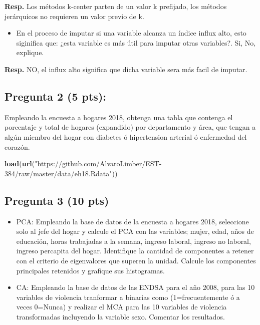 \documentclass[
]{article}
\newenvironment{Shaded}{\begin{snugshade}}{\end{snugshade}}
\newcommand{\KeywordTok}[1]{\textcolor[rgb]{0.13,0.29,0.53}{\textbf{#1}}}
\newcommand{\NormalTok}[1]{#1}
\newcommand{\StringTok}[1]{\textcolor[rgb]{0.31,0.60,0.02}{#1}}
\providecommand{\tightlist}{%
  \setlength{\itemsep}{0pt}\setlength{\parskip}{0pt}}
\begin{document}
\textbf{Resp.} Los métodos k-center parten de un valor k prefijado, los
métodos jerárquicos no requieren un valor previo de k.

\begin{itemize}
\tightlist
\item
  En el proceso de imputar si una variable alcanza un índice influx
  alto, esto siginifica que: ¿esta variable es más útil para imputar
  otras variables?. Si, No, explique.
\end{itemize}

\textbf{Resp.} NO, el influx alto significa que dicha variable sera más
facil de imputar.

\hypertarget{pregunta-2-5-pts}{%
\subsection{Pregunta 2 (5 pts):}\label{pregunta-2-5-pts}}

Empleando la encuesta a hogares 2018, obtenga una tabla que contenga el
porcentaje y total de hogares (expandido) por departamento y área, que
tengan a algún miembro del hogar con diabetes ó hipertension arterial ó
enfermedad del corazón.

\begin{Shaded}
\begin{Highlighting}[]
\KeywordTok{load}\NormalTok{(}\KeywordTok{url}\NormalTok{(}\StringTok{"https://github.com/AlvaroLimber/EST-384/raw/master/data/eh18.Rdata"}\NormalTok{))}
\end{Highlighting}
\end{Shaded}

\hypertarget{pregunta-3-10-pts}{%
\subsection{Pregunta 3 (10 pts)}\label{pregunta-3-10-pts}}

\begin{itemize}
\tightlist
\item
  PCA: Empleando la base de datos de la encuesta a hogares 2018,
  seleccione solo al jefe del hogar y calcule el PCA con las variables;
  mujer, edad, años de educación, horas trabajadas a la semana, ingreso
  laboral, ingreso no laboral, ingreso percapita del hogar. Identifique
  la cantidad de componentes a retener con el criterio de eigenvalores
  que superen la unidad. Calcule los componentes principales retenidos y
  grafique sus histogramas.
\item
  CA: Empleando la base de datos de las ENDSA para el año 2008, para las
  10 variables de violencia tranformar a binarias como (1=frecuentemente
  ó a veces 0=Nunca) y realizar el MCA para las 10 variables de
  violencia transformadas incluyendo la variable sexo. Comentar los
  resultados.
\end{itemize}
\end{document}
